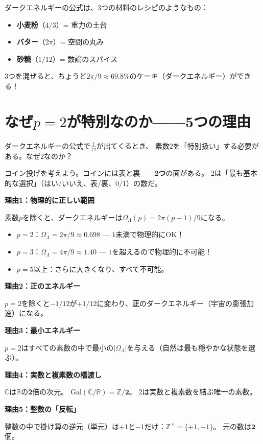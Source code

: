 \documentclass[12pt,a4paper]{article}
\begin{document}
\begin{analogybox}[ケーキのレシピ]
ダークエネルギーの公式は、3つの材料のレシピのようなもの：

\begin{itemize}
\item \textbf{小麦粉}（$4/3$）= 重力の土台
\item \textbf{バター}（$2\pi$）= 空間の丸み
\item \textbf{砂糖}（$1/12$）= 数論のスパイス
\end{itemize}

3つを混ぜると、ちょうど$2\pi/9 \approx 69.8\%$のケーキ（ダークエネルギー）ができる！
\end{analogybox}

\section{なぜ$p=2$が特別なのか——5つの理由}

\begin{ideabox}[コイン投げのアナロジー]
ダークエネルギーの公式で$\frac{1}{12}$が出てくるとき、
素数$2$を「特別扱い」する必要がある。なぜ$2$なのか？

コイン投げを考えよう。コインには表と裏——\textbf{2つ}の面がある。
$2$は「最も基本的な選択」（はい/いいえ、表/裏、0/1）の数だ。
\end{ideabox}

\begin{mathbox}[$p=2$が唯一の物理的素数である5つの理由]

\textbf{理由1：物理的に正しい範囲}

素数$p$を除くと、ダークエネルギーは$\Omega_\Lambda(p) = 2\pi(p-1)/9$になる。
\begin{itemize}
\item $p=2$：$\Omega_\Lambda = 2\pi/9 \approx 0.698$ --- $1$未満で物理的にOK！
\item $p=3$：$\Omega_\Lambda = 4\pi/9 \approx 1.40$ --- $1$を超えるので物理的に不可能！
\item $p=5$以上：さらに大きくなり、すべて不可能。
\end{itemize}

\textbf{理由2：正のエネルギー}

$p=2$を除くと$-1/12$が$+1/12$に変わり、\textbf{正}のダークエネルギー（宇宙の膨張加速）になる。

\textbf{理由3：最小エネルギー}

$p=2$はすべての素数の中で最小の$|\Omega_\Lambda|$を与える（自然は最も穏やかな状態を選ぶ）。

\textbf{理由4：実数と複素数の橋渡し}

$\mathbb{C}$は$\mathbb{R}$の\textbf{2}倍の次元。
$\mathrm{Gal}(\mathbb{C}/\mathbb{R}) = \mathbb{Z}/\mathbf{2}$。
$2$は実数と複素数を結ぶ唯一の素数。

\textbf{理由5：整数の「反転」}

整数の中で掛け算の逆元（単元）は$+1$と$-1$だけ：$\mathbb{Z}^\times = \{+1, -1\}$。
元の数は$\mathbf{2}$個。
\end{mathbox}
\end{document}
